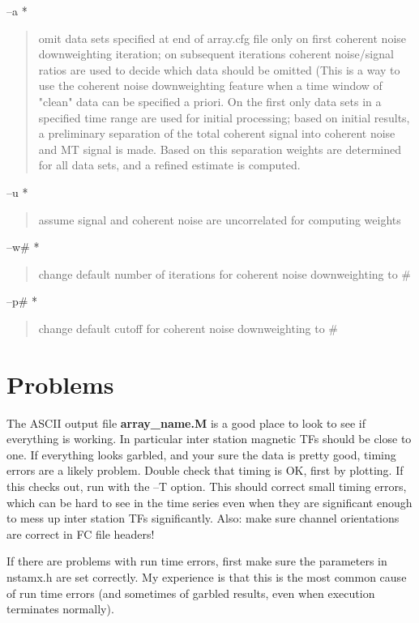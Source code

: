 --a *
\begin{quote}
omit data sets specified at end of {array.cfg} file only on first 
coherent noise downweighting iteration; on subsequent iterations 
coherent noise/signal ratios are used to decide which data should be omitted
(This is a way to use the coherent noise downweighting feature when a 
time window of "clean" data can be specified  a priori.  On the first
only data sets in a specified time range are used for initial processing;
based on initial results, a preliminary separation of the total coherent
signal into coherent noise and MT signal is made.  Based on this separation
weights are determined for all data sets, and a refined estimate is computed.
\end{quote}

--u *
\begin{quote}
assume signal and coherent noise are uncorrelated for computing weights
\end{quote}

--w\# *
\begin{quote}
change default number of iterations for coherent noise downweighting to \#
\end{quote}

--p\# *
\begin{quote}
change default cutoff for coherent noise downweighting to \#
\end{quote}

\section{Problems}

The ASCII output file {\bf array\_name.M} is a good place to look to see if 
everything is working.  In particular
inter station magnetic TFs should be close to one.
If everything looks garbled, and your sure the data is pretty good,
timing errors are a likely problem.  Double check that timing is OK,
first by plotting.  If this checks out, run with the --T option.  This
should correct small timing errors, which can be hard to see in the time
series even when they are significant enough to mess up inter station TFs
significantly.  Also: make sure channel orientations are correct in FC
file headers!

If there are problems with run time errors, first make sure
the parameters in nstamx.h are set correctly.  My experience is that this
is the most common cause of run time errors (and sometimes of garbled
results, even when execution terminates normally).


